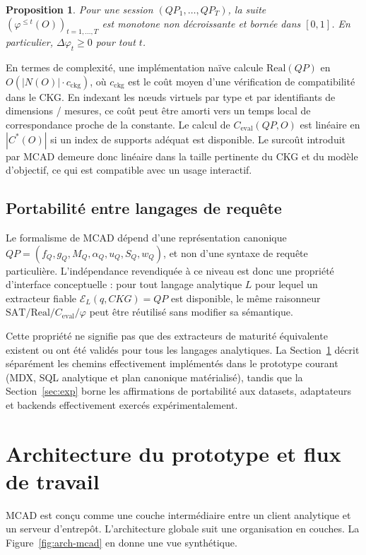 \documentclass[journal]{IEEEtran}
\newtheorem{proposition}{Proposition}
\begin{document}
\begin{proposition}
\label{prop:session}
Pour une session $(QP_1,\dots,QP_T)$, la suite $(\varphi^{\le t}(O))_{t=1,\dots,T}$ est monotone non décroissante et bornée dans $[0,1]$. En particulier, $\Delta\varphi_t\ge 0$ pour tout $t$.
\end{proposition}

En termes de complexité, une implémentation naïve calcule $\mathrm{Real}(QP)$ en $O(|N(O)|\cdot c_{\mathrm{ckg}})$, où $c_{\mathrm{ckg}}$ est le coût moyen d'une vérification de compatibilité dans le CKG. En indexant les nœuds virtuels par type et par identifiants de dimensions / mesures, ce coût peut être amorti vers un temps local de correspondance proche de la constante. Le calcul de $C_{\mathrm{eval}}(QP,O)$ est linéaire en $|C^*(O)|$ si un index de supports adéquat est disponible. Le surcoût introduit par MCAD demeure donc linéaire dans la taille pertinente du CKG et du modèle d'objectif, ce qui est compatible avec un usage interactif.

\subsection{Portabilité entre langages de requête}

Le formalisme de MCAD dépend d'une représentation canonique
$QP=(f_Q,g_Q,M_Q,\alpha_Q,u_Q,S_Q,w_Q)$, et non d'une syntaxe de requête
particulière. L'indépendance revendiquée à ce niveau est donc une propriété
d'interface conceptuelle : pour tout langage analytique $L$ pour lequel un
extracteur fiable $\mathcal{E}_L(q,CKG)=QP$ est disponible, le même raisonneur
$\mathrm{SAT}/\mathrm{Real}/C_{\mathrm{eval}}/\varphi$ peut être réutilisé sans
modifier sa sémantique.

Cette propriété ne signifie pas que des extracteurs de maturité équivalente
existent ou ont été validés pour tous les langages analytiques. La
Section~\ref{sec:arch} décrit séparément les chemins effectivement implémentés
dans le prototype courant (MDX, SQL analytique et plan canonique matérialisé),
tandis que la Section~\ref{sec:exp} borne les affirmations de portabilité aux
datasets, adaptateurs et backends effectivement exercés expérimentalement.

\section{Architecture du prototype et flux de travail}
\label{sec:arch}

MCAD est conçu comme une couche intermédiaire entre un client analytique et un serveur d'entrepôt. L'architecture globale suit une organisation en couches. La Figure~\ref{fig:arch-mcad} en donne une vue synthétique.
\end{document}
